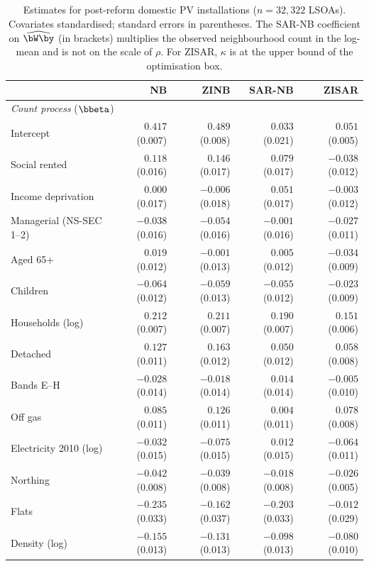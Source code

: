 \begin{table}[htbp]
\centering
\caption{Estimates for post-reform domestic PV installations ($n=32{,}322$ LSOAs). Covariates standardised; standard errors in parentheses. The SAR-NB coefficient on $\widehat{\bW\by}$ (in brackets) multiplies the observed neighbourhood count in the log-mean and is not on the scale of $\rho$. For ZISAR, $\kappa$ is at the upper bound of the optimisation box.}\label{tab:app_estimates}
\footnotesize
\begin{tabular}{lrrrr}
\toprule
 & NB & ZINB & SAR-NB & ZISAR \\
\midrule
\multicolumn{5}{l}{\textit{Count process} ($\bbeta$)} \\
Intercept                  & $0.417$ (0.007) & $0.489$ (0.008) & $0.033$ (0.021) & $0.051$ (0.005) \\
Social rented              & $0.118$ (0.016) & $0.146$ (0.017) & $0.079$ (0.017) & $-0.038$ (0.012) \\
Income deprivation         & $0.000$ (0.017) & $-0.006$ (0.018) & $0.051$ (0.017) & $-0.003$ (0.012) \\
Managerial (NS-SEC 1--2)   & $-0.038$ (0.016) & $-0.054$ (0.016) & $-0.001$ (0.016) & $-0.027$ (0.011) \\
Aged 65+                   & $0.019$ (0.012) & $-0.001$ (0.013) & $0.005$ (0.012) & $-0.034$ (0.009) \\
Children                   & $-0.064$ (0.012) & $-0.059$ (0.013) & $-0.055$ (0.012) & $-0.023$ (0.009) \\
Households (log)           & $0.212$ (0.007) & $0.211$ (0.007) & $0.190$ (0.007) & $0.151$ (0.006) \\
Detached                   & $0.127$ (0.011) & $0.163$ (0.012) & $0.050$ (0.012) & $0.058$ (0.008) \\
Bands E--H                 & $-0.028$ (0.014) & $-0.018$ (0.014) & $0.014$ (0.014) & $-0.005$ (0.010) \\
Off gas                    & $0.085$ (0.011) & $0.126$ (0.011) & $0.004$ (0.011) & $0.078$ (0.008) \\
Electricity 2010 (log)     & $-0.032$ (0.015) & $-0.075$ (0.015) & $0.012$ (0.015) & $-0.064$ (0.011) \\
Northing                   & $-0.042$ (0.008) & $-0.039$ (0.008) & $-0.018$ (0.008) & $-0.026$ (0.005) \\
Flats                      & $-0.235$ (0.033) & $-0.162$ (0.037) & $-0.203$ (0.033) & $-0.012$ (0.029) \\
Density (log)              & $-0.155$ (0.013) & $-0.131$ (0.013) & $-0.098$ (0.013) & $-0.080$ (0.010) \\

\end{tabular}
\end{table}
